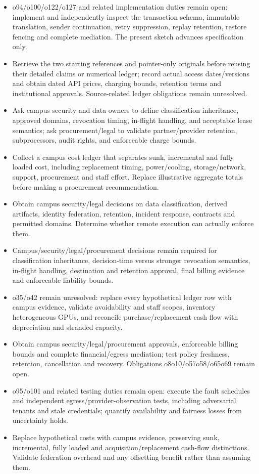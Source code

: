 \documentclass[11pt]{article}
\begin{document}
\begin{itemize}
\item o94/o100/o122/o127 and related implementation duties remain open: implement and independently inspect the transaction schema, immutable translation, sender continuation, retry suppression, replay retention, restore fencing and complete mediation. The present sketch advances specification only.
\item Retrieve the two starting references and pointer-only originals before reusing their detailed claims or numerical ledger; record actual access dates/versions and obtain dated API prices, charging bounds, retention terms and institutional approvals. Source-related ledger obligations remain unresolved.
\item Ask campus security and data owners to define classification inheritance, approved domains, revocation timing, in-flight handling, and acceptable lease semantics; ask procurement/legal to validate partner/provider retention, subprocessors, audit rights, and enforceable charge bounds.
\item Collect a campus cost ledger that separates sunk, incremental and fully loaded cost, including replacement timing, power/cooling, storage/network, support, procurement and staff effort. Replace illustrative aggregate totals before making a procurement recommendation.
\item Obtain campus security/legal decisions on data classification, derived artifacts, identity federation, retention, incident response, contracts and permitted domains. Determine whether remote execution can actually enforce them.
\item Campus/security/legal/procurement decisions remain required for classification inheritance, decision-time versus stronger revocation semantics, in-flight handling, destination and retention approval, final billing evidence and enforceable liability bounds.
\item o35/o42 remain unresolved: replace every hypothetical ledger row with campus evidence, validate avoidability and staff scopes, inventory heterogeneous GPUs, and reconcile purchase/replacement cash flow with depreciation and stranded capacity.
\item Obtain campus security/legal/procurement approvals, enforceable billing bounds and complete financial/egress mediation; test policy freshness, retention, cancellation and recovery. Obligations o8\textendash{}o10/o57\textendash{}o58/o65\textendash{}o69 remain open.
\item o95/o101 and related testing duties remain open: execute the fault schedules and independent egress/provider-observation tests, including adversarial tenants and stale credentials; quantify availability and fairness losses from uncertainty holds.
\item Replace hypothetical costs with campus evidence, preserving sunk, incremental, fully loaded and acquisition/replacement cash-flow distinctions. Validate federation overhead and any offsetting benefit rather than assuming them.
\end{itemize}
\end{document}
